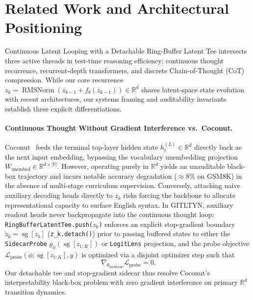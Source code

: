 \section{Related Work and Architectural Positioning}
\label{sec:related-work}

Continuous Latent Looping with a Detachable Ring-Buffer Latent Tee intersects three active threads in test-time reasoning efficiency: continuous thought recurrence, recurrent-depth transformers, and discrete Chain-of-Thought (CoT) compression. While our core recurrence $z_k = \operatorname{RMSNorm}(z_{k-1} + f_{\theta}(z_{k-1})) \in \mathbb{R}^d$ shares latent-space state evolution with recent architectures, our systems framing and auditability invariants establish three explicit differentiations.

\paragraph{Continuous Thought Without Gradient Interference vs.\ Coconut.}
Coconut~\cite{hao2024coconut} feeds the terminal top-layer hidden state $h_t^{(L)} \in \mathbb{R}^d$ directly back as the next input embedding, bypassing the vocabulary unembedding projection $W_{\text{unembed}} \in \mathbb{R}^{d \times \lvert V \rvert}$. However, operating purely in $\mathbb{R}^d$ yields an unauditable black-box trajectory and incurs notable accuracy degradation ($\approx 8\%$ on GSM8K) in the absence of multi-stage curriculum supervision. Conversely, attaching naive auxiliary decoding heads directly to $z_k$ risks forcing the backbone to allocate representational capacity to surface English syntax. In GITLTYN, auxiliary readout heads never backpropagate into the continuous thought loop: \texttt{RingBufferLatentTee.push($z_k$)} enforces an explicit stop-gradient boundary $\tilde{z}_k = \operatorname{sg}[z_k]$ (\texttt{z\_k.detach()}) prior to passing buffered states to either the \texttt{SidecarProbe} $g_{\phi}(\operatorname{sg}[z_{1:K}])$ or \texttt{LogitLens} projection, and the probe objective $\mathcal{L}_{\text{probe}}(\phi; \operatorname{sg}[z_{1:K}], y)$ is optimized via a disjoint optimizer step such that
\begin{equation}
  \nabla_{\theta_{\text{backbone}}} \mathcal{L}_{\text{probe}} = 0.
\end{equation}
Our detachable tee and stop-gradient sidecar thus resolve Coconut's interpretability black-box problem with zero gradient interference on primary $\mathbb{R}^d$ transition dynamics.


